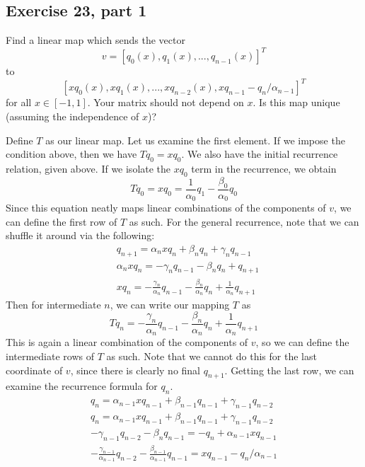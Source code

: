\subsection{Exercise 23, part 1}
Find a linear map which sends the vector 
\[v = [q_0(x), q_1(x), ..., q_{n-1}(x)]^T\]
to
\[[xq_0(x), xq_1(x), ..., xq_{n-2}(x), xq_{n - 1} - q_n / \alpha_{n-1}]^T\]
for all $x \in [-1, 1]$. Your matrix should not depend on $x$. Is this map unique (assuming the independence of $x$)?
\partbreak
\begin{solution}

    Define $T$ as our linear map. Let us examine the first element. If we impose the condition above, then we have $Tq_0 = xq_0$. We also have the initial recurrence relation, given above. If we isolate the $xq_0$ term in the recurrence, we obtain
    \[Tq_0 = xq_0 = \frac{1}{\alpha_0}q_1 - \frac{\beta_0}{\alpha_0}q_0\]
    Since this equation neatly maps linear combinations of the components of $v$, we can define the first row of $T$ as such. For the general recurrence, note that we can shuffle it around via the following:
    \begin{align*}
        &q_{n+1} = \alpha_nx q_n +\beta_nq_n + \gamma_n q_{n-1}\\
        &\alpha_nxq_n= -\gamma_n q_{n-1} - \beta_n q_n + q_{n+1}\\
        &xq_n = -\frac{\gamma_n}{\alpha_n}q_{n-1} - \frac{\beta_n}{\alpha_n}q_n + \frac{1}{\alpha_n}q_{n+1}
    \end{align*}
    Then for intermediate $n$, we can write our mapping $T$ as 
    \[Tq_n = -\frac{\gamma_n}{\alpha_n}q_{n-1} - \frac{\beta_n}{\alpha_n}q_n + \frac{1}{\alpha_n}q_{n+1}\]
    This is again a linear combination of the components of $v$, so we can define the intermediate rows of $T$ as such. Note that we cannot do this for the last coordinate of $v$, since there is clearly no final $q_{n+1}$. Getting the last row, we can examine the recurrence formula for $q_n$. 
    \begin{align*}
        q_n = \alpha_{n-1}xq_{n-1} + \beta_{n-1}q_{n-1} + \gamma_{n-1}q_{n-2}\\
        q_n= \alpha_{n-1}xq_{n-1} + \beta_{n-1}q_{n-1} + \gamma_{n-1}q_{n-2}\\
         - \gamma_{n-1}q_{n-2}- \beta_nq_{n-1}= - q_n + \alpha_{n-1}xq_{n-1}\\
         - \frac{\gamma_{n-1}}{\alpha_{n-1}}q_{n-2}-\frac{\beta_{n-1}}{\alpha_{n-1}}q_{n-1} = xq_{n-1} - q_n / \alpha_{n-1}
    \end{align*}

\end{solution}
